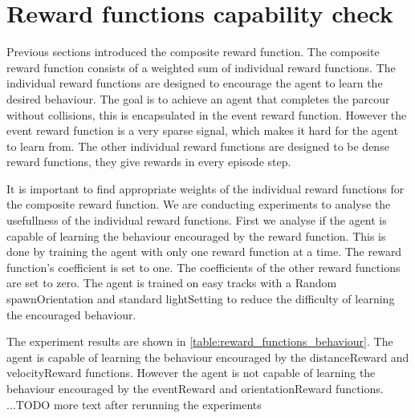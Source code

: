 

\section{Reward functions capability check}

Previous sections introduced the composite reward function. The composite reward function consists of a weighted sum of individual reward functions. The individual reward functions are designed to encourage the agent to learn the desired behaviour. The goal is to achieve an agent that completes the parcour without collisions, this is encapsulated in the event reward function. However the event reward function is a very sparse signal, which makes it hard for the agent to learn from. The other individual reward functions are designed to be dense reward functions, they give rewards in every episode step.

It is important to find appropriate weights of the individual reward functions for the composite reward function. We are conducting experiments to analyse the usefullness of the individual reward functions. First we analyse if the agent is capable of learning the behaviour encouraged by the reward function.
This is done by training the agent with only one reward function at a time. The reward function's coefficient is set to one. The coefficients of the other reward functions are set to zero. The agent is trained on easy tracks with a Random spawnOrientation and standard lightSetting to reduce the difficulty of learning the encouraged behaviour.


The experiment results are shown in \ref{table:reward_functions_behaviour}. The agent is capable of learning the behaviour encouraged by the distanceReward and velocityReward functions. However the agent is not capable of learning the behaviour encouraged by the eventReward and orientationReward functions. 
...TODO more text after rerunning the experiments


